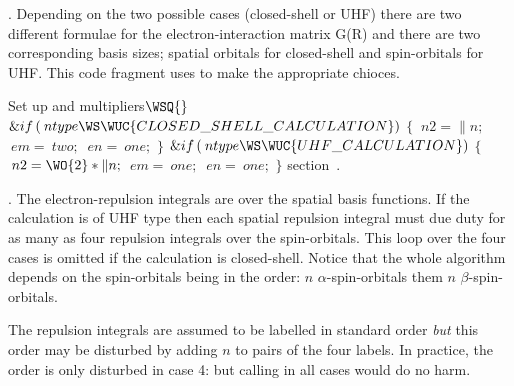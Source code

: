 . Depending on the two possible cases (closed-shell or
UHF) there are two different formulae for the
electron-interaction matrix G(R) and there are two corresponding
basis sizes; spatial orbitals for closed-shell and spin-orbitals
for UHF. This code fragment uses  to make the
appropriate chioces.

\WY\WP\4\4Set up  and  multipliers\X \X${}\WSQ{}$%
\6
$\&{if}\,(\>{ntype}\WS\WUC{CLOSED\_SHELL\_CALCULATION})$\1\7
$\{$\7
$\>{n2}=\|n;$\5
\6
$\>{em}=\>{two};$\6
$\>{en}=\>{one};$\5
\7
$\}$\2\7
$\&{if}\,(\>{ntype}\WS\WUC{UHF\_CALCULATION})$\1\7
$\{$\6
$\>{n2}=\WO{2}\ast\|n;$\5
\6
$\>{em}=\>{one};$\6
$\>{en}=\>{one};$\5
\7
$\}$\2\Wendc
\WU section~.
\fi %

. The electron-repulsion integrals are over the spatial
basis functions. If the calculation is of UHF type then
each spatial repulsion integral must due duty for as many
as four repulsion integrals over the spin-orbitals. This
loop over the four cases is omitted if the
calculation is closed-shell. Notice that the whole
algorithm depends on the spin-orbitals being
in the order: $n$ $\alpha$-spin-orbitals them $n$
$\beta$-spin-orbitals.

The repulsion integrals are assumed to be labelled in
standard order {\em but} this order may be disturbed
by adding $n$ to pairs of the four labels. In practice,
the order is only disturbed in case 4: but calling
 in all cases would do no harm.

